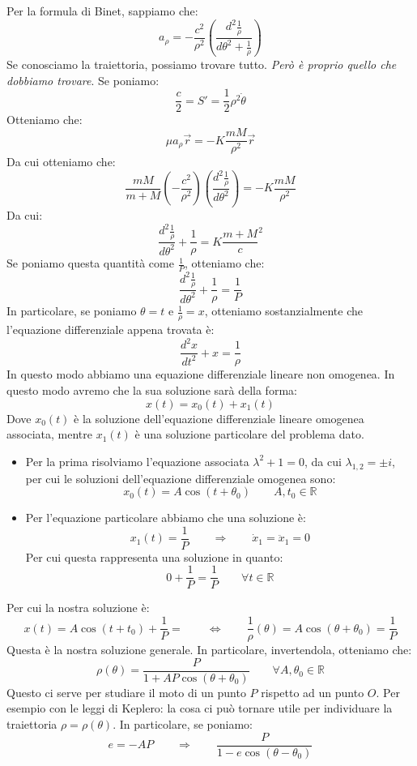 \documentclass[11pt,a4paper,twoside]{article}
\theoremstyle{definition}
\begin{document}
Per la formula di Binet, sappiamo che:
\[ a_\rho = -\frac{c^2}{\rho^2}\left( \frac{d^2 \frac 1 \rho}{d\theta^2 + \frac 1\rho} \right) \]
Se conosciamo la traiettoria, possiamo trovare tutto. \textit{Però è proprio quello che dobbiamo trovare}. Se poniamo:
\[ \frac c2 = S' = \frac 12 \rho^2 \dot \theta \]
Otteniamo che:
\[ \mu a_\rho \vec r = -K\frac{mM}{\rho^2}\vec r \]
Da cui otteniamo che:
\[ \frac{mM}{m+M} \left(-\frac{c^2}{\rho^2}\right)\left( \frac{d^2 \frac 1 \rho}{d \theta^2} \right) = -K\frac{mM}{\rho^2} \]
Da cui:
\[ \frac{d^2\frac 1\rho}{d \theta^2} + \frac 1 \rho = K\frac{m+M}c^2 \]
Se poniamo questa quantità come $\frac 1P$, otteniamo che:
\[ \frac{d^2\frac 1\rho}{d \theta^2} + \frac 1 \rho = \frac 1P\]
In particolare, se poniamo $\theta = t$ e $\frac 1 \rho = x$, otteniamo sostanzialmente che l'equazione differenziale appena trovata è:
\[ \frac{d^2x}{dt^2} + x = \frac 1\rho \]
In questo modo abbiamo una equazione differenziale lineare non omogenea. In questo modo avremo che la sua soluzione sarà della forma:
\[x(t) = x_0(t) + x_1(t)\]
Dove $x_0(t)$ è la soluzione dell'equazione differenziale lineare omogenea associata, mentre $x_1(t)$ è una soluzione particolare del problema dato.
\begin{itemize}
	\item Per la prima risolviamo l'equazione associata $\lambda^2 + 1 = 0$, da cui $\lambda_{1,2} = \pm i$, per cui le soluzioni dell'equazione differenziale omogenea sono:
		\[ x_0(t) = A\cos (t + \theta_0) \qquad A, t_0 \in \mathbb R \]
	\item Per l'equazione particolare abbiamo che una soluzione è:
		\[ x_1(t) = \frac 1P \qquad \Rightarrow \qquad \dot x_1 = \ddot x_1 = 0\]
		Per cui questa rappresenta una soluzione in quanto:
		\[ 0 + \frac 1P = \frac 1P \qquad \forall t \in \mathbb R \]
\end{itemize}
Per cui la nostra soluzione è:
\[ x(t) = A \cos (t + t_0) + \frac 1P = \qquad \Leftrightarrow \qquad \frac 1\rho(\theta) = A \cos(\theta + \theta_0) = \frac 1P\]
Questa è la nostra soluzione generale. In particolare, invertendola, otteniamo che:
\[ \rho(\theta) = \frac P{1 + A P \cos(\theta + \theta_0)}\qquad \forall A,\theta_0 \in \mathbb R \]
Questo ci serve per studiare il moto di un punto $P$ rispetto ad un punto $O$. Per esempio con le leggi di Keplero: la cosa ci può tornare utile per individuare la traiettoria $\rho=\rho(\theta)$. In particolare, se poniamo:
\[ e = -AP \qquad \Rightarrow \qquad \frac P{1 - e\cos(\theta-\theta_0)} \]
\end{document}
